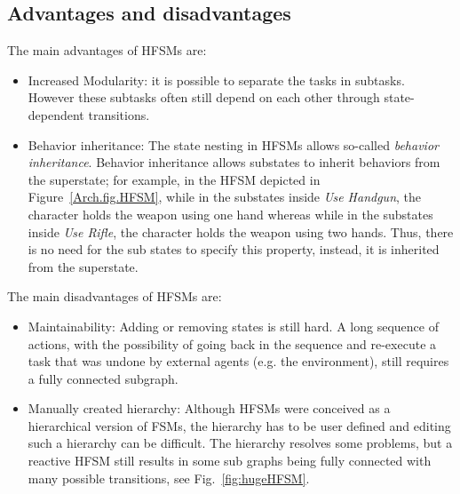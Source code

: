 \subsection{Advantages and disadvantages}



The main advantages of HFSMs are:

\begin{itemize}
\item Increased Modularity: it is possible to separate the tasks in subtasks. However these subtasks often still depend on each other through state-dependent transitions.
\item Behavior inheritance: The state nesting in HFSMs allows so-called \emph{behavior inheritance}. Behavior inheritance allows substates to inherit behaviors from the superstate; for example,  in the HFSM depicted in Figure~\ref{Arch.fig.HFSM}, while in the substates inside \emph{Use Handgun}, the character holds the weapon using one hand whereas while in the substates inside \emph{Use Rifle}, the character holds the weapon using two hands. Thus, there is no need for the sub states to specify this property, instead, it is inherited from the superstate.
\end{itemize}
The main disadvantages of HFSMs are:
\begin{itemize}
\item Maintainability: Adding or removing states is still hard. A long sequence of actions, with the possibility of going back in the sequence and re-execute a task that was undone by external agents (e.g. the environment), still requires a fully connected subgraph.
\item Manually created hierarchy: Although HFSMs were conceived as a hierarchical version of FSMs, the hierarchy has to be user defined and editing such a hierarchy  can be difficult. The hierarchy resolves some problems, but a reactive HFSM still results in some sub graphs being fully connected with many possible transitions, see Fig.~\ref{fig:hugeHFSM}.
\end{itemize}

